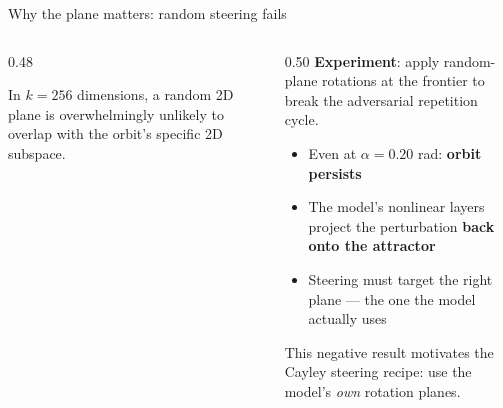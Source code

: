 \documentclass[aspectratio=169, 11pt]{beamer}
\begin{document}
\begin{frame}{Why the plane matters: random steering fails}
\vspace{-0.3em}
\begin{columns}[c]
\begin{column}{0.48\textwidth}
\begin{center}
\end{center}

\vspace{0.2em}
{\scriptsize In $k{=}256$ dimensions, a random 2D plane is overwhelmingly unlikely to overlap with the orbit's specific 2D subspace.}
\end{column}
\begin{column}{0.50\textwidth}
{\small \textbf{Experiment}: apply random-plane rotations at the frontier to break the adversarial repetition cycle.}

\vspace{0.2em}
\begin{itemize}\small\setlength{\itemsep}{2pt}
  \item Even at $\alpha = 0.20$ rad: \textbf{orbit persists}
  \item The model's nonlinear layers project the perturbation \textbf{back onto the attractor}
  \item \alert{Steering must target the right plane} --- the one the model actually uses
\end{itemize}

\vspace{0.2em}
{\small This negative result motivates the Cayley steering recipe: use the model's \emph{own} rotation planes.}
\end{column}
\end{columns}
\end{frame}
\end{document}
